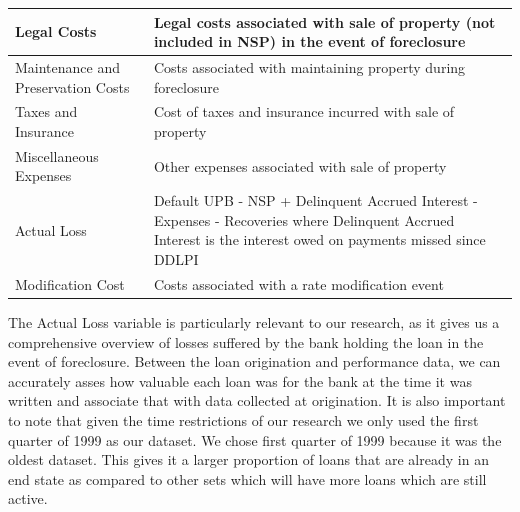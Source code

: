 \documentclass[12 pt]{uncw_thesis}
\theoremstyle{plain}
\theoremstyle{remark}
\theoremstyle{definition}
\begin{document}
\begin{center}
\begin{longtable}{ |M{6cm}|M{8cm}| }
		\hline
		Legal Costs & Legal costs associated with sale of property (not included in NSP) in the event of foreclosure\\
		\hline
		Maintenance and Preservation Costs & Costs associated with maintaining property during foreclosure\\
		\hline
		Taxes and Insurance & Cost of taxes and insurance incurred with sale of property\\
		\hline
		Miscellaneous Expenses & Other expenses associated with sale of property \\
		\hline
		Actual Loss & Default UPB - NSP + Delinquent Accrued Interest - Expenses - Recoveries where Delinquent Accrued Interest is the interest owed on payments missed since DDLPI\\
		\hline
		Modification Cost & Costs associated with a rate modification event\\
		\hline
	\end{longtable}
	\vspace{-\baselineskip}
\end{center}
The Actual Loss variable is particularly relevant to our research, as it gives us a comprehensive overview of losses suffered by the bank holding the loan in the event of foreclosure. Between the loan origination and performance data, we can accurately asses how valuable each loan was for the bank at the time it was written and associate that with data collected at origination. It is also important to note that given the time restrictions of our research we only used the first quarter of 1999 as our dataset. We chose first quarter of 1999 because it was the oldest dataset. This gives it a larger proportion of loans that are already in an end state as compared to other sets which will have more loans which are still active.
\end{document}
